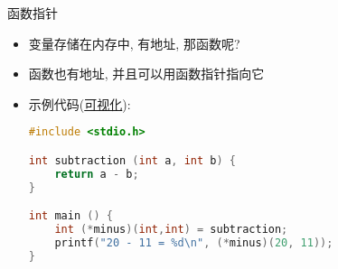 \begin{frame}[fragile]{函数指针}
    \begin{itemize}[<+- | alert@+>]
        \item 变量存储在内存中, 有地址, 那函数呢?
        \item 函数也有地址, 并且可以用函数指针指向它
        \item 示例代码(\href{http://pythontutor.com/c.html#code=\%23include\%20\%3Cstdio.h\%3E\%0A\%0Aint\%20addition\%20\%28int\%20a,\%20int\%20b\%29\%0A\%7B\%20return\%20a\%20\%2B\%20b\%3B\%20\%7D\%0A\%0Aint\%20subtraction\%20\%28int\%20a,\%20int\%20b\%29\%0A\%7B\%20return\%20a\%20-\%20b\%3B\%20\%7D\%0A\%0Aint\%20multiplication\%28int\%20a,\%20int\%20b\%29\%0A\%7B\%20return\%20a\%20*\%20b\%3B\%20\%7D\%0A\%0Aint\%20operation\%20\%28int\%20x,\%20int\%20y,\%20int\%20\%28*func\%29\%28int,\%20int\%29\%29\%20\%7B\%0A\%20\%20int\%20g\%3B\%0A\%20\%20g\%20\%3D\%20\%28*func\%29\%28x,\%20y\%29\%3B\%0A\%20\%20return\%20g\%3B\%0A\%7D\%0A\%0Aint\%20main\%20\%28\%29\%20\%7B\%0A\%20\%20int\%20m,\%20n\%3B\%0A\%20\%20char\%20t\%3B\%0A\%20\%20int\%20\%28*minus\%29\%28int,int\%29\%20\%3D\%20subtraction\%3B\%0A\%20\%20int\%20\%28*funcs\%5B\%5D\%29\%28int,\%20int\%29\%20\%3D\%20\%7Bmultiplication,\%20addition\%7D\%3B\%0A\%0A\%20\%20m\%20\%3D\%20operation\%20\%288,\%203,\%20addition\%29\%3B\%0A\%20\%20n\%20\%3D\%20operation\%20\%2820,\%20m,\%20minus\%29\%3B\%0A\%0A\%20\%20printf\%28\%22\%25d\%20\%25d\%5Cn\%22,\%20m,\%20n\%29\%3B\%0A\%0A\%20\%20while\%20\%28scanf\%28\%22\%25d\%20\%25d\%20\%25c\%22,\%20\%26m,\%20\%26n,\%20\%26t\%29\%20\%3D\%3D\%203\%29\%0A\%20\%20\%20\%20printf\%28\%22\%25d\%20\%25c\%20\%25d\%20\%3D\%20\%25d\%5Cn\%22,\%20m,\%20t,\%20n,\%20funcs\%5Bt\%20-\%20'*'\%5D\%28m,\%20n\%29\%29\%3B\%0A\%0A\%20\%20return\%200\%3B\%0A\%7D&mode=edit&origin=opt-frontend.js&py=c&rawInputLstJSON=\%5B\%5D}{可视化}):
        \scriptsize\begin{lstlisting}[language=c]
#include <stdio.h>

int subtraction (int a, int b) {
    return a - b;
}

int main () {
    int (*minus)(int,int) = subtraction;
    printf("20 - 11 = %d\n", (*minus)(20, 11));
}
        \end{lstlisting}
    \end{itemize}
\end{frame}